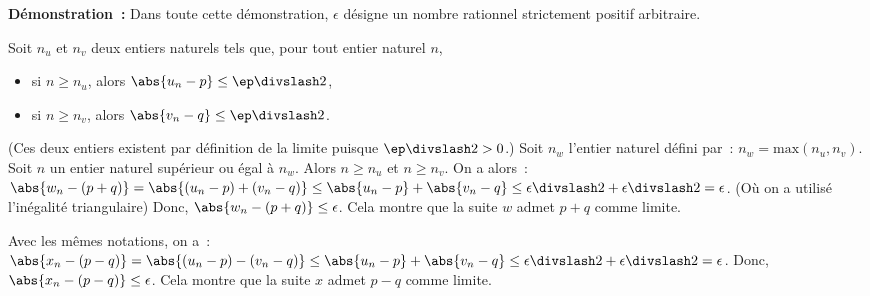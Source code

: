 \medskip

\noindent\textbf{Démonstration :}
    Dans toute cette démonstration, $\epsilon$ désigne un nombre rationnel strictement positif arbitraire.

    Soit $n_u$ et $n_v$ deux entiers naturels tels que, pour tout entier naturel $n$, 
    \begin{itemize}[nosep]
        \item si $n \geq n_u$, alors $\abs{u_n - p} \leq \ep \divslash 2$, 
        \item si $n \geq n_v$, alors $\abs{v_n - q} \leq \ep \divslash 2$. 
    \end{itemize}
    (Ces deux entiers existent par définition de la limite puisque $\ep \divslash 2 > 0$.)
    Soit $n_w$ l'entier naturel défini par : $n_w = \mathrm{max}(n_u, n_v)$. 
    Soit $n$ un entier naturel supérieur ou égal à $n_w$. 
    Alors $n \geq n_u$ et $n \geq n_v$. 
    On a alors : $\abs{w_n - (p+q)} = \abs{(u_n-p) + (v_n-q)} \leq \abs{u_n-p} + \abs{v_n-q} \leq \epsilon \divslash 2 + \epsilon \divslash 2 = \epsilon$.
    (Où on a utilisé l'inégalité triangulaire)
    Donc, $\abs{w_n - (p+q)} \leq \epsilon$.
    Cela montre que la suite $w$ admet $p+q$ comme limite.

    Avec les mêmes notations, on a : $\abs{x_n - (p-q)} = \abs{(u_n-p) - (v_n-q)} \leq \abs{u_n-p} + \abs{v_n-q} \leq \epsilon \divslash 2 + \epsilon \divslash 2 = \epsilon$.
    Donc, $\abs{x_n - (p-q)} \leq \epsilon$.
    Cela montre que la suite $x$ admet $p-q$ comme limite.

